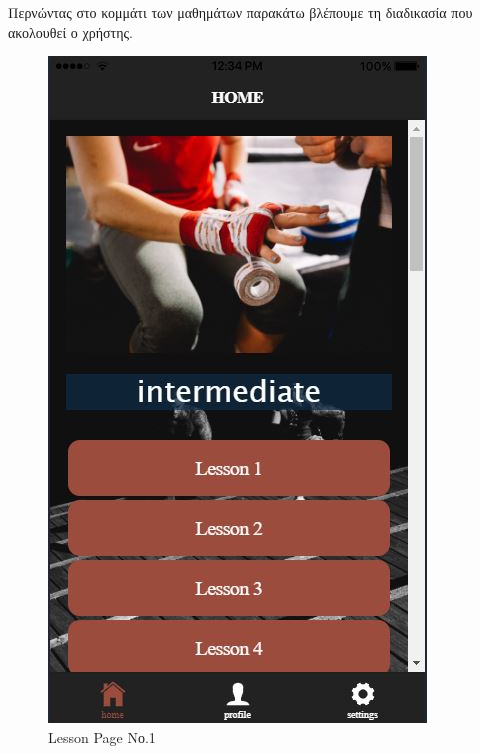 \documentclass[a4paper,12pt]{article}
\begin{document}
			Περνώντας στο κομμάτι των μαθημάτων παρακάτω βλέπουμε τη διαδικασία που ακολουθεί ο χρήστης.
			\newpage
			\begin{figure}[!htb]
				\caption{Lesson Page Νο.1}
				\vspace*{0.5cm}

				  \includegraphics[width=\linewidth]{home2}
				  

\end{figure}
\end{document}
